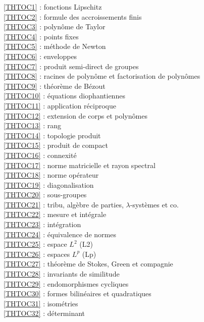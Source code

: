 \ref {THTOC1} : fonctions Lipschitz\\
\ref {THTOC2} : formule des accroissements finis\\
\ref {THTOC3} : polynôme de Taylor\\
\ref {THTOC4} : points fixes\\
\ref {THTOC5} : méthode de Newton\\
\ref {THTOC6} : enveloppes\\
\ref {THTOC7} : produit semi-direct de groupes\\
\ref {THTOC8} : racines de polynôme et factorisation de polynômes\\
\ref {THTOC9} : théorème de Bézout\\
\ref {THTOC10} : équations diophantiennes\\
\ref {THTOC11} : application réciproque\\
\ref {THTOC12} : extension de corps et polynômes\\
\ref {THTOC13} : rang\\
\ref {THTOC14} : topologie produit\\
\ref {THTOC15} : produit de compact\\
\ref {THTOC16} : connexité\\
\ref {THTOC17} : norme matricielle et rayon spectral\\
\ref {THTOC18} : norme opérateur\\
\ref {THTOC19} : diagonalisation\\
\ref {THTOC20} : sous-groupes\\
\ref {THTOC21} : tribu, algèbre de parties, \( \lambda \)-systèmes et co.\\
\ref {THTOC22} : mesure et intégrale\\
\ref {THTOC23} : intégration\\
\ref {THTOC24} : équivalence de normes\\
\ref {THTOC25} : espace \( L^2\) (L2)\\
\ref {THTOC26} : espaces \( L^p\) (Lp)\\
\ref {THTOC27} : théorème de Stokes, Green et compagnie\\
\ref {THTOC28} : invariants de similitude\\
\ref {THTOC29} : endomorphismes cycliques\\
\ref {THTOC30} : formes bilinéaires et quadratiques\\
\ref {THTOC31} : isométries\\
\ref {THTOC32} : déterminant\\
